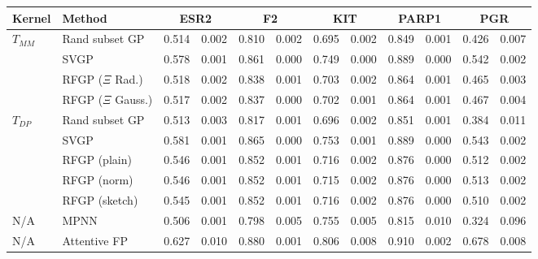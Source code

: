 \begin{tabular}
{llr@{\hspace{0.02cm}$\pm$\hspace{0.02cm}}l@{\hspace{0.30cm}}r@{\hspace{0.02cm}$\pm$\hspace{0.02cm}}l@{\hspace{0.30cm}}r@{\hspace{0.02cm}$\pm$\hspace{0.02cm}}l@{\hspace{0.30cm}}r@{\hspace{0.02cm}$\pm$\hspace{0.02cm}}l@{\hspace{0.30cm}}r@{\hspace{0.02cm}$\pm$\hspace{0.02cm}}l@{\hspace{0.30cm}}}
\toprule
Kernel & Method & \multicolumn{2}{c}{ESR2} & \multicolumn{2}{c}{F2} & \multicolumn{2}{c}{KIT} & \multicolumn{2}{c}{PARP1} & \multicolumn{2}{c}{PGR}\\
\midrule
$T_{MM}$ & Rand subset GP & 0.514 & 0.002 & 0.810 & 0.002 & 0.695 & 0.002 & 0.849 & 0.001 & 0.426 & 0.007\\
 & SVGP & 0.578 & 0.001 & 0.861 & 0.000 & 0.749 & 0.000 & 0.889 & 0.000 & 0.542 & 0.002\\
 & RFGP ($\Xi$ Rad.) & 0.518 & 0.002 & 0.838 & 0.001 & 0.703 & 0.002 & 0.864 & 0.001 & 0.465 & 0.003\\
 & RFGP ($\Xi$ Gauss.) & 0.517 & 0.002 & 0.837 & 0.000 & 0.702 & 0.001 & 0.864 & 0.001 & 0.467 & 0.004\\
\midrule
$T_{DP}$ & Rand subset GP & 0.513 & 0.003 & 0.817 & 0.001 & 0.696 & 0.002 & 0.851 & 0.001 & 0.384 & 0.011\\
 & SVGP & 0.581 & 0.001 & 0.865 & 0.000 & 0.753 & 0.001 & 0.889 & 0.000 & 0.543 & 0.002\\
 & RFGP (plain) & 0.546 & 0.001 & 0.852 & 0.001 & 0.716 & 0.002 & 0.876 & 0.000 & 0.512 & 0.002\\
 & RFGP (norm) & 0.546 & 0.001 & 0.852 & 0.001 & 0.715 & 0.002 & 0.876 & 0.000 & 0.513 & 0.002\\
 & RFGP (sketch) & 0.545 & 0.001 & 0.852 & 0.001 & 0.716 & 0.002 & 0.876 & 0.000 & 0.510 & 0.002\\
\midrule
N/A & MPNN & 0.506 & 0.001  & 0.798 & 0.005  & 0.755 & 0.005  & 0.815 &  0.010 & 0.324 &  0.096 \\
N/A & Attentive FP & 0.627 &  0.010 & 0.880 &  0.001 & 0.806 &  0.008 & 0.910 &  0.002 & 0.678 & 0.008 \\
\bottomrule
\end{tabular}
